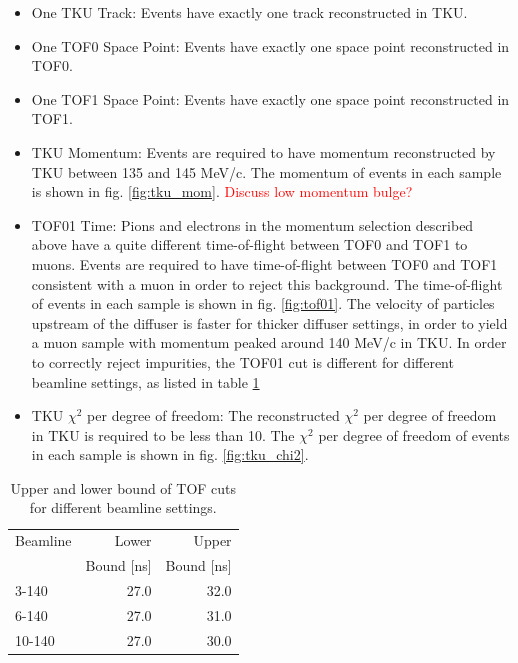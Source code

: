 \begin{itemize}
\item{One TKU Track:} Events have exactly one track reconstructed in TKU.
\item{One TOF0 Space Point:} Events have exactly one space point reconstructed in
TOF0.
\item{One TOF1 Space Point:} Events have exactly one space point reconstructed in
TOF1.
\item{TKU Momentum:} Events are required to have momentum reconstructed by TKU 
between 135 and 145 MeV/c. The momentum of events in each sample is shown in 
fig. \ref{fig:tku_mom}.
\textcolor{red}{Discuss low momentum bulge?}
\item{TOF01 Time:} Pions and electrons in the momentum selection described above
have a quite different time-of-flight between TOF0 and TOF1 to muons. Events are 
required to have time-of-flight between TOF0 and TOF1 consistent with a muon in
order to reject this background. The time-of-flight of events in each sample is 
shown in fig. \ref{fig:tof01}. The velocity of particles upstream of the diffuser
is faster for thicker diffuser settings, in order to yield a muon sample with
momentum peaked around 140 MeV/c in TKU. In order to correctly reject impurities,
the TOF01 cut is different for different beamline settings, as listed in table 
\ref{tab:tof01_cut}
\item{TKU $\chi^2$ per degree of freedom:} The reconstructed $\chi^2$ per degree of freedom in TKU is 
required to be less than 10. The $\chi^2$ per degree of freedom of events in 
each sample is shown in fig. \ref{fig:tku_chi2}.
\end{itemize}

\begin{table}
\caption{Upper and lower bound of TOF cuts for different beamline settings.
\label{tab:tof01_cut}}
\centering
\begin{tabular}[pos]{l|rr}
Beamline & Lower       & Upper \\
         & Bound [ns]  & Bound [ns] \\
\hline
3-140    & 27.0          & 32.0 \\
6-140    & 27.0          & 31.0 \\
10-140   & 27.0          & 30.0 \\
\end{tabular}
\end{table}

